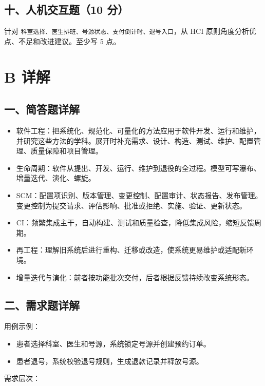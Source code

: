 \documentclass[UTF8,zihao=-4]{ctexart}
\begin{document}
\subsection{十、人机交互题（10 分）}


针对 \texttt{科室选择、医生排班、号源状态、支付倒计时、退号入口}，从 HCI 原则角度分析优点、不足和改进建议。至少写 5 点。


\section{B 详解}


\subsection{一、简答题详解}


\begin{itemize}
\item 软件工程：把系统化、规范化、可量化的方法应用于软件开发、运行和维护，并研究这些方法的学科。展开时补充需求、设计、构造、测试、维护、配置管理、质量保障和项目管理。
\item 生命周期：软件从提出、开发、运行、维护到退役的全过程。模型可写瀑布、增量迭代、演化、螺旋。
\item SCM：配置项识别、版本管理、变更控制、配置审计、状态报告、发布管理。变更控制为提交请求、评估影响、批准或拒绝、实施、验证、更新状态。
\item CI：频繁集成主干，自动构建、测试和质量检查，降低集成风险，缩短反馈周期。
\item 再工程：理解旧系统后进行重构、迁移或改造，使系统更易维护或适配新环境。
\item 增量迭代与演化：前者按功能批次交付，后者根据反馈持续改变系统形态。
\end{itemize}



\subsection{二、需求题详解}


用例示例：


\begin{itemize}
\item 患者选择科室、医生和号源，系统锁定号源并创建预约订单。
\item 患者退号，系统校验退号规则，生成退款记录并释放号源。
\end{itemize}


需求层次：
\end{document}
